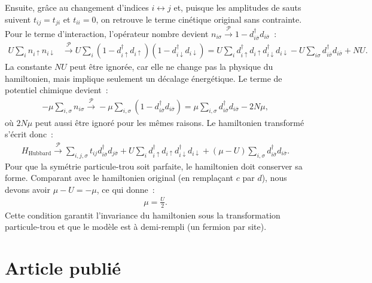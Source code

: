 Ensuite, grâce au changement d'indices $i \leftrightarrow j$ et, puisque les
amplitudes de sauts suivent $t_{ij} = t_{ji}$ et $t_{ii}=0$, on retrouve le
terme cinétique original sans contrainte. Pour le terme d'interaction,
l'opérateur nombre devient $n_{i\sigma} \xrightarrow{\mathcal{P}} 1 -
d^\dagger_{i\bar{\sigma}}d_{i\bar{\sigma}}$~:
\begin{align}
    U\sum_i n_{i\uparrow}n_{i\downarrow} &\xrightarrow{\mathcal{P}} U\sum_i
    (1 - d^\dagger_{i\uparrow}d_{i\uparrow})(1 -
    d^\dagger_{i\downarrow}d_{i\downarrow})
    = U\sum_i
    d^\dagger_{i\uparrow}d_{i\uparrow}d^\dagger_{i\downarrow}d_{i\downarrow}
    -U\sum_{i\sigma} d^\dagger_{i\bar{\sigma}}d_{i\bar{\sigma}} + NU.
\end{align}
La constante $NU$ peut être ignorée, car elle ne change pas la physique du
hamiltonien, mais implique seulement un décalage énergétique. Le terme de
potentiel chimique devient~:
\begin{align}
    -\mu\sum_{i,\sigma} n_{i\sigma} \xrightarrow{\mathcal{P}}
    -\mu\sum_{i,\sigma}(1 - d^\dagger_{i\bar{\sigma}}d_{i\bar{\sigma}})
    = \mu\sum_{i,\sigma} d^\dagger_{i\bar{\sigma}}d_{i\bar{\sigma}} - 2N\mu,
\end{align}
où $2N\mu$ peut aussi être ignoré pour les mêmes raisons. Le hamiltonien
transformé s'écrit donc~:
\begin{align}
    H_{\text{Hubbard}}\xrightarrow{\mathcal{P}} \sum_{i,j,\sigma}
    t_{ij}d^\dagger_{i\bar{\sigma}}d_{j\bar{\sigma}}
    +
    U\sum_{i}d^\dagger_{i\uparrow}d_{i\uparrow}d^\dagger_{i\downarrow}d_{i\downarrow}
    + (\mu - U)\sum_{i,\sigma}d^\dagger_{i\bar{\sigma}}d_{i\bar{\sigma}}.
    \label{eq: ph-hubbard}
\end{align}
Pour que la symétrie particule-trou soit parfaite, le hamiltonien doit conserver
sa forme. Comparant avec le hamiltonien original (en remplaçant $c$ par $d$),
nous devons avoir $\mu - U = -\mu$, ce qui donne~:
\begin{align}
    \boxed{\mu = \frac{U}{2}.}
    \label{eq: condition_mu_ph}
\end{align}
Cette condition garantit l'invariance du hamiltonien sous la transformation
particule-trou et que le modèle est à demi-rempli (un fermion par site).

\chapter{Article publié} \label{chap: article}


